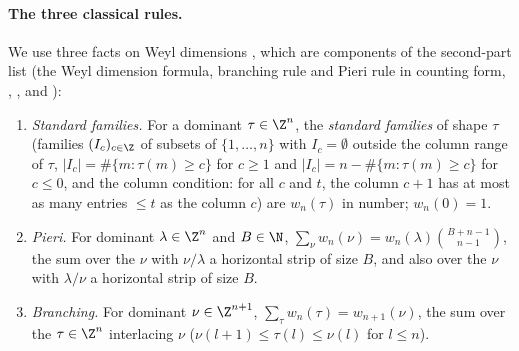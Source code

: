 \paragraph{The three classical rules.} We use three facts on Weyl dimensions \cite{FultonHarris1991,GelfandTsetlin1950},
which are components of the second-part list (the Weyl dimension formula, branching rule and Pieri rule in counting form,
, , and ):
\begin{enumerate}[label=(\roman*)]
\item \emph{Standard families.} For a dominant $\tau\in\Z^n$, the \emph{standard families} of shape $\tau$ (families
$(I_c)_{c\in\Z}$ of subsets of $\{1,\dots,n\}$ with $I_c=\emptyset$ outside the column range of $\tau$,
$|I_c|=\#\{m:\tau(m)\ge c\}$ for $c\ge1$ and $|I_c|=n-\#\{m:\tau(m)\ge c\}$ for $c\le0$, and the column condition: for all $c$
and $t$, the column $c+1$ has at most as many entries $\le t$ as the column $c$) are $w_n(\tau)$ in number; $w_n(0)=1$.
\item \emph{Pieri.} For dominant $\lambda\in\Z^n$ and $B\in\N$,
$\sum_{\nu}w_n(\nu)=w_n(\lambda)\binom{B+n-1}{n-1}$, the sum over the $\nu$ with $\nu/\lambda$ a horizontal strip of size $B$,
and also over the $\nu$ with $\lambda/\nu$ a horizontal strip of size $B$.
\item \emph{Branching.} For dominant $\nu\in\Z^{n+1}$, $\sum_\tau w_n(\tau)=w_{n+1}(\nu)$, the sum over the $\tau\in\Z^n$
interlacing $\nu$ ($\nu(l+1)\le\tau(l)\le\nu(l)$ for $l\le n$).
\end{enumerate}

